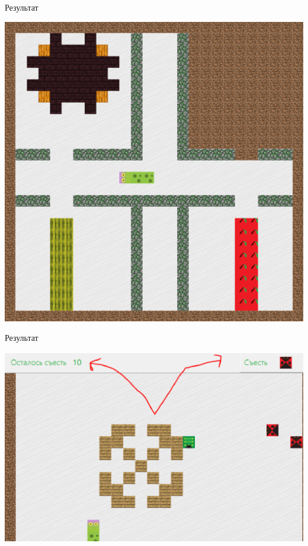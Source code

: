 \documentclass[size=14pt,paper=screen,style=paintings]{powerdot}
\begin{document}
\begin{slide}{{\normalsize Результат}}
\vspace*{1cm}
\begin{center}
\includegraphics[scale=0.3]{img8.eps}
\end{center}
\end{slide}

\begin{slide}{{\normalsize Результат}}
\vspace*{1cm}
\begin{center}
\includegraphics[scale=0.3]{img9.eps}
\end{center}

\end{slide}
\end{document}
